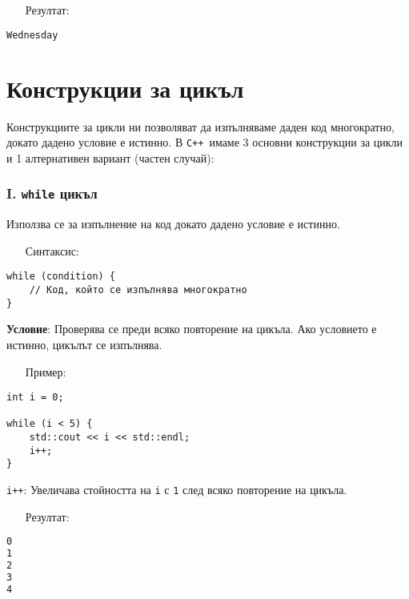 \documentclass[oneside]{book}
\newcommand*{\code}[1]{\texttt{#1}}
\newcommand*{\cpp}{\texttt{C++}\ }
\begin{document}
\begin{itemize}\item[Резултат:]\end{itemize}\vspace{-18pt}
\begin{mdframed}\begin{lstlisting}[language=bash]
Wednesday
\end{lstlisting}\end{mdframed}

\section{Конструкции за цикъл}
Конструкциите за цикли ни позволяват да изпълняваме даден код многократно, докато дадено условие е истинно. В \cpp имаме 3 основни конструкции за цикли и 1 алтернативен вариант (частен случай):

\subsubsection{I. \code{while} цикъл}
Използва се за изпълнение на код докато дадено условие е истинно.

\begin{itemize}\item[Синтаксис:]\end{itemize}
\begin{mdframed}\begin{lstlisting}
while (condition) {
    // Код, който се изпълнява многократно
}
\end{lstlisting}\end{mdframed}

\textbf{Условие}: Проверява се преди всяко повторение на цикъла. Ако условието е истинно, цикълът се изпълнява.

\begin{itemize}\item[Пример:]\end{itemize}
\begin{mdframed}\begin{lstlisting}
int i = 0;

while (i < 5) {
    std::cout << i << std::endl;
    i++;
}
\end{lstlisting}\end{mdframed}

\code{i++}: Увеличава стойността на \code{i} с \code{1} след всяко повторение на цикъла.

\begin{itemize}\item[Резултат:]\end{itemize}
\begin{mdframed}\begin{lstlisting}[language=bash]
0
1
2
3
4
\end{lstlisting}\end{mdframed}
\end{document}
